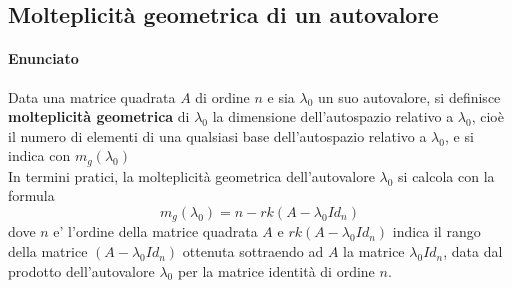 \documentclass[a4paper, 10pt]{article}
\begin{document}
	\subsection{Molteplicità geometrica di un autovalore}	
	\paragraph*{Enunciato}Data una matrice quadrata $A$ di ordine $n$ e sia $\lambda_0$ un suo autovalore, si definisce
    \textbf{molteplicità geometrica} di $\lambda_0$ la dimensione dell'autospazio relativo a $\lambda_0$, cioè il numero di
	elementi di una qualsiasi base dell'autospazio relativo a $\lambda_0$, e si indica con $m_g(\lambda_0)$ \\
	In termini pratici, la molteplicità geometrica dell'autovalore $\lambda_0$ si calcola con la formula 
	\[ m_g(\lambda_0) = n - rk(A- \lambda_0 Id_n) \] dove $n$ e' l'ordine della matrice quadrata $A$ e $rk(A-\lambda_0 Id_n)$
	indica il rango della matrice $(A - \lambda_0 Id_n)$ ottenuta sottraendo ad $A$ la matrice $\lambda_0 Id_n$, data dal
	prodotto dell'autovalore $\lambda_0$ per la matrice identità di ordine $n$.
	
\end{document}
